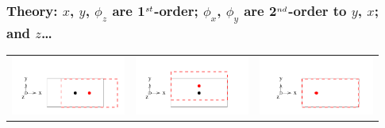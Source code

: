 \documentclass[compress]{beamer}
\begin{document}
\begin{frame}
\frametitle{Theory: \small $x$, $y$, $\phi_z$ are 1$^{\mbox \scriptsize st}$-order; $\phi_x$, $\phi_y$ are 2$^{\mbox \scriptsize nd}$-order to $y$, $x$; and $z$\ldots}
\vspace{-1 cm}
\begin{center}
\begin{tabular}{p{0.31\linewidth} p{0.31\linewidth} p{0.31\linewidth}}
  \begin{minipage}{\linewidth}
    \includegraphics[width=\linewidth]{dof_x.pdf}
  \end{minipage} &
  \begin{minipage}{\linewidth}
    \includegraphics[width=\linewidth]{dof_y.pdf}
  \end{minipage} &
  \begin{minipage}{\linewidth}
    \includegraphics[width=\linewidth]{dof_z.pdf}

\end{minipage}
\end{tabular}
\end{center}
\end{frame}
\end{document}
